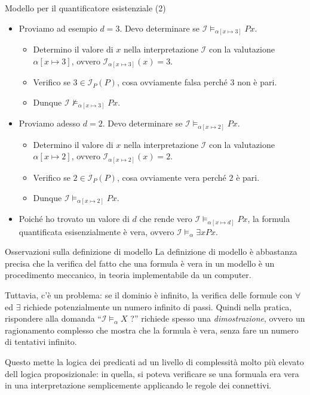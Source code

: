 \documentclass[aspectratio=169,10pt,dvipsnames,xcolor=table,handout]{beamer}
\newcommand{\mcI}{\mathcal{I}}
\begin{document}
\begin{frame}{Modello per il quantificatore esistenziale (2)}
    \begin{itemize}[<+->]
        \item Proviamo ad esempio $d=3$. Devo determinare se $\mcI \models_{\alpha[x \mapsto 3]} Px$.
              \begin{itemize}[<+->]
                  \item Determino il valore di $x$ nella interpretazione $\mcI$ con la valutazione $\alpha[x \mapsto 3]$, ovvero $\mcI_{\alpha[x \mapsto 3]}(x) = 3$.
                  \item Verifico se $3 \in \mcI_P(P)$, cosa ovviamente falsa perché $3$ non è pari.
                  \item Dunque $\mcI \not\models_{\alpha[x \mapsto 3]} Px$.
              \end{itemize}
        \item Proviamo adesso $d=2$. Devo determinare se $\mcI \models_{\alpha[x \mapsto 2]} Px$.
              \begin{itemize}[<+->]
                  \item Determino il valore di $x$ nella interpretazione $\mcI$ con la valutazione $\alpha[x \mapsto 2]$, ovvero $\mcI_{\alpha[x \mapsto 2]}(x) = 2$.
                  \item Verifico se $2 \in \mcI_P(P)$, cosa ovviamente vera perché $2$ è pari.
                  \item Dunque $\mcI \models_{\alpha[x \mapsto 2]} Px$.
              \end{itemize}
        \item Poiché ho trovato un valore di $d$ che rende vero  $\mcI \models_{\alpha[x \mapsto d]} Px$, la formula quantificata esisenzialmente è vera, ovvero $\mcI \models_{\alpha} \exists x Px$.
    \end{itemize}
\end{frame}


\begin{frame}{Osservazioni sulla definizione di modello}
    La definizione di modello è abbastanza precisa che la verifica del fatto che una formula è vera in un modello è un procedimento meccanico, in teoria implementabile da un computer.

    \medskip Tuttavia, c'è un problema: se il dominio è infinito, la verifica delle formule con $\forall$ ed $\exists$ richiede potenzialmente un numero infinito di passi. Quindi nella pratica, rispondere alla domanda ``$\mcI \models_\alpha X$ ?'' richiede spesso una \emph{dimostrazione}, ovvero un ragionamento complesso che mostra che la formula è vera, senza fare un numero di tentativi infinito.

    \medskip
    Questo mette la logica dei predicati ad un livello di complessità molto più elevato dell logica proposizionale: in quella, si poteva verificare se una formuala era vera in una interpretazione semplicemente applicando le regole dei connettivi.
\end{frame}
\end{document}
